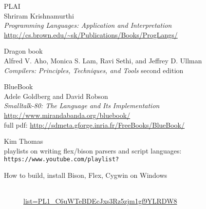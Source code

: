 \begin{thebibliography}{99}

 PLAI\\
Shriram Krishnamurthi\\
\emph{Programming Languages: Application and Interpretation}\\
\url{http://cs.brown.edu/~sk/Publications/Books/ProgLangs/}

 Dragon book\\
Alfred V. Aho, Monica S. Lam, Ravi Sethi, and Jeffrey D. Ullman\\
\emph{Compilers: Principles, Techniques, and Tools} second edition

 BlueBook\\
Adele Goldberg and David Robson\\
\emph{Smalltalk-80: The Language and Its Implementation}\\
\url{http://www.mirandabanda.org/bluebook/}\\
full pdf: \url{http://sdmeta.gforge.inria.fr/FreeBooks/BlueBook/}

Kim Thomas\\playlists on writing flex/bison parsers and script languages:\\
\verb|https://www.youtube.com/playlist?|\\
\begin{description}
\item[How to build, install Bison, Flex, Cygwin on Windows]\ \\
\href{https://www.youtube.com/playlist?list=PL1\_C6uWTeBDEcJxs3Rz5zjm1gf9YLRDW8}{list=PL1\_C6uWTeBDEcJxs3Rz5zjm1gf9YLRDW8}
\item[]
\end{description}

\end{thebibliography}